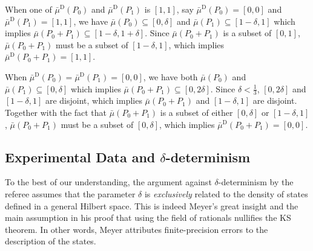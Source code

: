 \documentclass[english,reprint, aps, prl,superscriptaddress, showpacs,
showkeys, longbibliography, amsmath, amssymb, floatfix]{revtex4-1}
\theoremstyle{plain}
\theoremstyle{definition}
\newcommand{\imposs}{\ensuremath{\left[0,0\right]}}
\newcommand{\necess}{\ensuremath{\left[1,1\right]}}
\begin{document}
When one of $\bar{\mu}^{\textrm{D}}\left(P_{0}\right)$ and $\bar{\mu}^{\textrm{D}}\left(P_{1}\right)$
is $\necess$, say $\bar{\mu}^{\textrm{D}}\left(P_{0}\right)=\imposs$
and $\bar{\mu}^{\textrm{D}}\left(P_{1}\right)=\necess$, we have $\bar{\mu}\left(P_{0}\right)\subseteq\left[0,\delta\right]$
and $\bar{\mu}\left(P_{1}\right)\subseteq\left[1-\delta,1\right]$ which
implies $\bar{\mu}\left(P_{0}+P_{1}\right)\subseteq\left[1-\delta,1+\delta\right]$.
Since $\bar{\mu}\left(P_{0}+P_{1}\right)$ is a subset of $\left[0,1\right]$,
$\bar{\mu}\left(P_{0}+P_{1}\right)$ must be a subset of $\left[1-\delta,1\right]$,
which implies $\bar{\mu}^{\textrm{D}}\left(P_{0}+P_{1}\right)=\necess$.

When
$\bar{\mu}^{\textrm{D}}\left(P_{0}\right)=\bar{\mu}^{\textrm{D}}\left(P_{1}\right)=\imposs$,
we have both $\bar{\mu}\left(P_{0}\right)$ and
$\bar{\mu}\left(P_{1}\right)\subseteq\left[0,\delta\right]$ which
implies
$\bar{\mu}\left(P_{0}+P_{1}\right)\subseteq\left[0,2\delta\right]$.
Since $\delta<\frac{1}{3}$, $\left[0,2\delta\right]$ and
$\left[1-\delta,1\right]$ are disjoint, which implies
$\bar{\mu}\left(P_{0}+P_{1}\right)$ and $\left[1-\delta,1\right]$ are
disjoint. Together with the fact that
$\bar{\mu}\left(P_{0}+P_{1}\right)$ is a subset of either
$\left[0,\delta\right]$ or $\left[1-\delta,1\right]$,
$\bar{\mu}\left(P_{0}+P_{1}\right)$ must be a subset of
$\left[0,\delta\right]$, which implies
$\bar{\mu}^{\textrm{D}}\left(P_{0}+P_{1}\right)=\imposs$.

\subsection*{Experimental Data and \texorpdfstring{$\delta$}{delta}-determinism} 

To the best of our understanding, the argument against
$\delta$-determinism by the referee assumes that the parameter
$\delta$ is \emph{exclusively} related to the density of states
defined in a general Hilbert space. This is indeed Meyer's great
insight and the main assumption in his proof that using the field of
rationals nullifies the KS theorem.  In other words, Meyer attributes
finite-precision errors to the description of the states.
\end{document}
